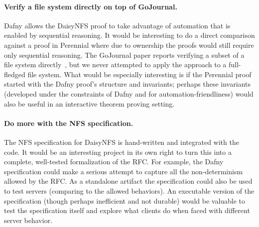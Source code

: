 \paragraph{Verify a file system directly on top of GoJournal.} Dafny allows
the DaisyNFS proof to take advantage of automation that is enabled by sequential
reasoning. It would be interesting to do a direct comparison against a proof in
Perennial where due to ownership the proofs would still require only sequential
reasoning. The GoJournal paper reports verifying a subset of a file system
directly~\cite{chajed:gojournal}, but we never attempted to apply the approach
to a full-fledged file system. What would be especially interesting is if the
Perennial proof started with the Dafny proof's structure and invariants; perhaps
these invariants (developed under the constraints of Dafny and for
automation-friendliness) would also be useful in an interactive theorem proving
setting.

\paragraph{Do more with the NFS specification.} The NFS specification for
DaisyNFS is hand-written and integrated with the code. It would be an
interesting project in its own right to turn this into a complete, well-tested
formalization of the RFC. For example, the Dafny specification could make a serious
attempt to capture all the non-determinism allowed by the RFC. As a standalone
artifact the specification could also be used to test servers (comparing to the
allowed behaviors). An executable version of the specification (though perhaps
inefficient and not durable) would be valuable to test the specification itself
and explore what clients do when faced with different server behavior.
